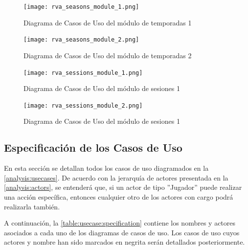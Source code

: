 \begin{figure}[H]
  \begin{center}
    \texttt{[image: rva\_seasons\_module\_1.png]}
  \end{center}
  \caption[Diagrama de Casos de Uso del módulo de temporadas 1]{Diagrama de Casos de Uso del módulo de temporadas 1}
  \label{fig:rva_seasons_module_1}
\end{figure}

\begin{figure}[H]
  \begin{center}
    \texttt{[image: rva\_seasons\_module\_2.png]}
  \end{center}
  \caption[Diagrama de Casos de Uso del módulo de temporadas 2]{Diagrama de Casos de Uso del módulo de temporadas 2}
  \label{fig:rva_seasons_module_2}
\end{figure}

\begin{figure}[H]
  \begin{center}
    \texttt{[image: rva\_sessions\_module\_1.png]}
  \end{center}
  \caption[Diagrama de Casos de Uso del módulo de sesiones 1]{Diagrama de Casos de Uso del módulo de sesiones 1}
  \label{fig:rva_sessions_module_1}
\end{figure}

\begin{figure}[H]
  \begin{center}
    \texttt{[image: rva\_sessions\_module\_2.png]}
  \end{center}
  \caption[Diagrama de Casos de Uso del módulo de sesiones 1]{Diagrama de Casos de Uso del módulo de sesiones 1}
  \label{fig:rva_sessions_module_2}
\end{figure}

\newpage

\subsection{Especificación de los Casos de Uso}
\label{analysis:usecases:specification}
En esta sección se detallan todos los casos de uso diagramados en la \autoref{analysis:usecases}. De acuerdo con la jerarquía de actores presentada en la \autoref{analysis:actors}, se entenderá que, si un actor de tipo ''Jugador'' puede realizar una acción específica, entonces cualquier otro de los actores con cargo podrá realizarla también.

A continuación, la \autoref{table:usecase:specification} contiene los nombres y actores asociados a cada uno de los diagramas de casos de uso. Los casos de uso cuyos actores y nombre han sido marcados en negrita serán detallados posteriormente.

